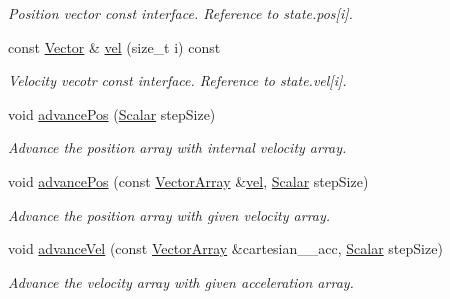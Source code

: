 \begin{DoxyCompactItemize}
\begin{DoxyCompactList}\small\item\em Position vector const interface. Reference to state.\+pos\mbox{[}i\mbox{]}. \end{DoxyCompactList}\item 
const \mbox{\hyperlink{class_space_h_1_1_vel_indep_particles_a61bbcfdb0dc7f99f3c68af69a755c935}{Vector}} \& \mbox{\hyperlink{class_space_h_1_1_vel_indep_chain_particles_a28464b3a1352cbab4a7a59a03b38ab85}{vel}} (size\+\_\+t i) const
\begin{DoxyCompactList}\small\item\em Velocity vecotr const interface. Reference to state.\+vel\mbox{[}i\mbox{]}. \end{DoxyCompactList}\item 
void \mbox{\hyperlink{class_space_h_1_1_vel_indep_chain_particles_a647d4861878b28d79b6aab00de12ab8d}{advance\+Pos}} (\mbox{\hyperlink{class_space_h_1_1_vel_indep_particles_aeb47d8131b30ed790320ff634f0d6af1}{Scalar}} step\+Size)
\begin{DoxyCompactList}\small\item\em Advance the position array with internal velocity array. \end{DoxyCompactList}\item 
void \mbox{\hyperlink{class_space_h_1_1_vel_indep_chain_particles_ae71e70b6374f8326b5ffb62d06284942}{advance\+Pos}} (const \mbox{\hyperlink{class_space_h_1_1_vel_indep_particles_aa9983058940249df8b00fa800e8cbad2}{Vector\+Array}} \&\mbox{\hyperlink{class_space_h_1_1_vel_indep_chain_particles_aadbc08f6cf8da3e46eb8d6c619e30c2f}{vel}}, \mbox{\hyperlink{class_space_h_1_1_vel_indep_particles_aeb47d8131b30ed790320ff634f0d6af1}{Scalar}} step\+Size)
\begin{DoxyCompactList}\small\item\em Advance the position array with given velocity array. \end{DoxyCompactList}\item 
void \mbox{\hyperlink{class_space_h_1_1_vel_indep_chain_particles_ae5253fbb69161c625f878de540618eb7}{advance\+Vel}} (const \mbox{\hyperlink{class_space_h_1_1_vel_indep_particles_aa9983058940249df8b00fa800e8cbad2}{Vector\+Array}} \&cartesian_\+\_\+acc, \mbox{\hyperlink{class_space_h_1_1_vel_indep_particles_aeb47d8131b30ed790320ff634f0d6af1}{Scalar}} step\+Size)
\begin{DoxyCompactList}\small\item\em Advance the velocity array with given acceleration array. \end{DoxyCompactList}\item 

\end{DoxyCompactItemize}
